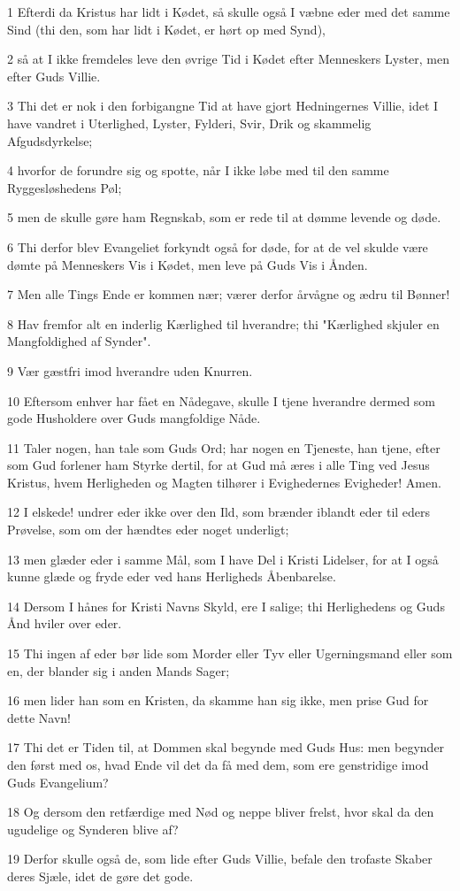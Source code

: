 \par 1 Efterdi da Kristus har lidt i Kødet, så skulle også I væbne eder med det samme Sind (thi den, som har lidt i Kødet, er hørt op med Synd),
\par 2 så at I ikke fremdeles leve den øvrige Tid i Kødet efter Menneskers Lyster, men efter Guds Villie.
\par 3 Thi det er nok i den forbigangne Tid at have gjort Hedningernes Villie, idet I have vandret i Uterlighed, Lyster, Fylderi, Svir, Drik og skammelig Afgudsdyrkelse;
\par 4 hvorfor de forundre sig og spotte, når I ikke løbe med til den samme Ryggesløshedens Pøl;
\par 5 men de skulle gøre ham Regnskab, som er rede til at dømme levende og døde.
\par 6 Thi derfor blev Evangeliet forkyndt også for døde, for at de vel skulde være dømte på Menneskers Vis i Kødet, men leve på Guds Vis i Ånden.
\par 7 Men alle Tings Ende er kommen nær; værer derfor årvågne og ædru til Bønner!
\par 8 Hav fremfor alt en inderlig Kærlighed til hverandre; thi "Kærlighed skjuler en Mangfoldighed af Synder".
\par 9 Vær gæstfri imod hverandre uden Knurren.
\par 10 Eftersom enhver har fået en Nådegave, skulle I tjene hverandre dermed som gode Husholdere over Guds mangfoldige Nåde.
\par 11 Taler nogen, han tale som Guds Ord; har nogen en Tjeneste, han tjene, efter som Gud forlener ham Styrke dertil, for at Gud må æres i alle Ting ved Jesus Kristus, hvem Herligheden og Magten tilhører i Evighedernes Evigheder! Amen.
\par 12 I elskede! undrer eder ikke over den Ild, som brænder iblandt eder til eders Prøvelse, som om der hændtes eder noget underligt;
\par 13 men glæder eder i samme Mål, som I have Del i Kristi Lidelser, for at I også kunne glæde og fryde eder ved hans Herligheds Åbenbarelse.
\par 14 Dersom I hånes for Kristi Navns Skyld, ere I salige; thi Herlighedens og Guds Ånd hviler over eder.
\par 15 Thi ingen af eder bør lide som Morder eller Tyv eller Ugerningsmand eller som en, der blander sig i anden Mands Sager;
\par 16 men lider han som en Kristen, da skamme han sig ikke, men prise Gud for dette Navn!
\par 17 Thi det er Tiden til, at Dommen skal begynde med Guds Hus: men begynder den først med os, hvad Ende vil det da få med dem, som ere genstridige imod Guds Evangelium?
\par 18 Og dersom den retfærdige med Nød og neppe bliver frelst, hvor skal da den ugudelige og Synderen blive af?
\par 19 Derfor skulle også de, som lide efter Guds Villie, befale den trofaste Skaber deres Sjæle, idet de gøre det gode.

